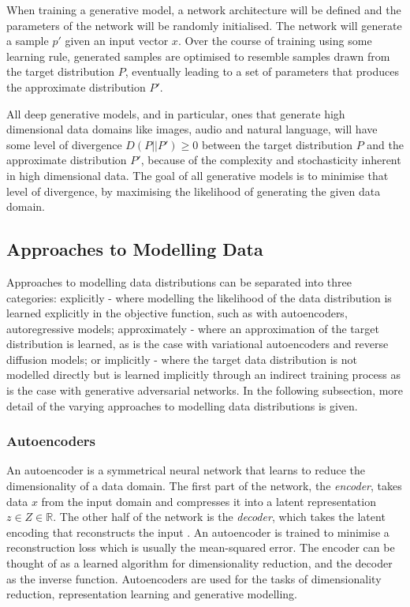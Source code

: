 When training a generative model, a network architecture will be defined and the parameters of the network will be randomly initialised.
The network will generate a sample $p'$ given an input vector $x$. 
Over the course of training using some learning rule, generated samples are optimised to resemble samples drawn from the target distribution $P$, eventually leading to a set of parameters that produces the approximate distribution $P'$.

All deep generative models, and in particular, ones that generate high dimensional data domains like images, audio and natural language, will have some level of divergence $D(P||P') \geq 0$ between the target distribution $P$ and the approximate distribution $P'$, because of the complexity and stochasticity inherent in high dimensional data. 
The goal of all generative models is to minimise that level of divergence, by maximising the likelihood of generating the given data domain.

\subsection{Approaches to Modelling Data}

Approaches to modelling data distributions can be separated into three categories: explicitly - where modelling the likelihood of the data distribution is learned explicitly in the objective function, such as with autoencoders, autoregressive models; approximately - where an approximation of the target distribution is learned, as is the case with variational autoencoders and reverse diffusion models; or implicitly - where the target data distribution is not modelled directly but is learned implicitly through an indirect training process as is the case with generative adversarial networks.
In the following subsection, more detail of the varying approaches to modelling data distributions is given. 

\subsubsection{Autoencoders}

An autoencoder is a symmetrical neural network that learns to reduce the dimensionality of a data domain.
The first part of the network, the \textit{encoder}, takes data $x$ from the input domain and compresses it into a latent representation $z \in Z \in \mathbb{R}$. 
The other half of the network is the \textit{decoder}, which takes the latent encoding that reconstructs the input \citep{kramer1991nonlinear}. 
An autoencoder is trained to minimise a reconstruction loss which is usually the mean-squared error.
The encoder can be thought of as a learned algorithm for dimensionality reduction, and the decoder as the inverse function. 
Autoencoders are used for the tasks of dimensionality reduction, representation learning and generative modelling.

